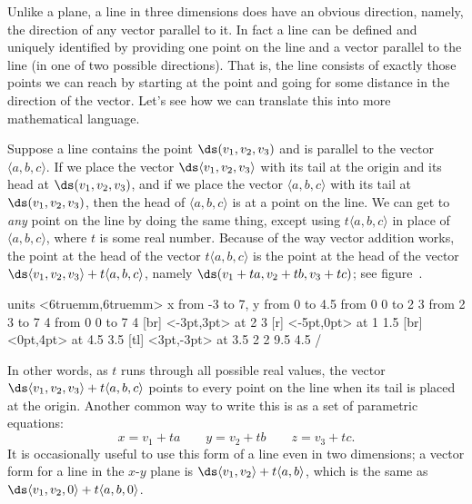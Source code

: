 Unlike a plane, a line in three dimensions does have an obvious
direction, namely, the direction of any vector parallel to it. In fact
a line can be defined and uniquely identified by providing one point
on the line and a vector parallel to the line (in one of two possible
directions). That is, the line consists of exactly those points we can
reach by starting at the point and going for some distance in the
direction of the vector. Let's see how we can translate this into more
mathematical language. 

Suppose a line contains the point $\ds (v_1,v_2,v_3)$ and is parallel
to the vector $\langle a,b,c\rangle$. If we place the vector $\ds
\langle v_1,v_2,v_3\rangle$ with its tail at the origin and its head
at $\ds (v_1,v_2,v_3)$, and if we place the vector $\langle
a,b,c\rangle$ with its tail at $\ds (v_1,v_2,v_3)$, then the head of
$\langle a,b,c\rangle$ is at a point on the line. We can get to {\it
  any\/} point on the line by doing the same thing, except using
$t\langle a,b,c\rangle$ in place of $\langle a,b,c\rangle$, where $t$
is some real number. Because of the way vector addition works, the
point at the head of the vector $t\langle a,b,c\rangle$ is the point
at the head of the vector $\ds \langle v_1,v_2,v_3\rangle+t\langle
a,b,c\rangle$, namely $\ds (v_1+ta,v_2+tb,v_3+tc)$; see
figure~.

\figure
\vbox{\beginpicture
\normalgraphs
\ninepoint
\setcoordinatesystem units <6truemm,6truemm>
\setplotarea x from -3 to 7, y from 0 to 4.5
\arrow <4pt> [0.35, 1] from 0 0 to 2 3
\arrow <4pt> [0.35, 1] from 2 3 to 7 4
\arrow <4pt> [0.35, 1] from 0 0 to 7 4
 [br] <-3pt,3pt> at 2 3
 [r] <-5pt,0pt> at 1 1.5
 [br] <0pt,4pt> at 4.5 3.5
 [tl]
  <3pt,-3pt> at 3.5 2
\setdashes
{} 2 9.5 4.5 /
\endpicture}

In other words, as $t$ runs through all possible real values, the
vector $\ds \langle v_1,v_2,v_3\rangle+t\langle a,b,c\rangle$ points to
every point on the line when its tail is placed at the origin. Another
common way to write this is as a set of 
{\dfont parametric equations\/}:
$$ x= v_1+ta\qquad y=v_2+tb \qquad z=v_3+tc.$$
It is occasionally useful to use this form of a line even in two
dimensions; a vector form for a line in the $x$-$y$ plane is
$\ds \langle v_1,v_2\rangle+t\langle a,b\rangle$, which is the same as
$\ds \langle v_1,v_2,0\rangle+t\langle a,b,0\rangle$.

